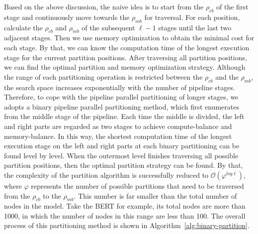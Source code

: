 Based on the above discussion,
the naive idea is to start from the $\rho_{cb}$
of the first stage and continuously move towards the $\rho_{mb}$ for traversal.
For each position, calculate the $\rho_{cb}$ and
$\rho_{mb}$ of the subsequent $\ell - 1$ stages
until the last two adjacent stages.
Then we use memory optimization to obtain the minimal cost for each stage.
By that, we can know the computation time of the longest execution stage for the current partition positions.
After traversing all partition positions,
we can find the optimal partition and memory optimization strategy.
Although the range of each partitioning operation is restricted between the $\rho_{cb}$
and the $\rho_{mb}$, the search space increases exponentially with the number of pipeline stages.
Therefore, to cope with the pipeline parallel partitioning of longer stages,
we adopts a binary pipeline parallel partitioning method,
which first enumerates from the middle stage of the pipeline.
Each time the middle is divided, the left and right parts are regarded as two stages
to achieve compute-balance and memory-balance.
In this way, the shortest computation time of the longest execution stage
on the left and right parts at each binary partitioning can be found level by level.
When the outermost level finishes traversing all possible partition positions,
then the optimal partition strategy can be found.
By that, the complexity of the partition algorithm is successfully
reduced to $\mathcal{O}(\varphi^{log\ell})$,
where $\varphi$ represents the number of possible partitions that
need to be traversed from the $\rho_{cb}$ to the $\rho_{mb}$.
This number is far smaller than the total number of nodes in the model.
Take the BERT for example, its total nodes are more than 1000,
in which the number of nodes in this range are less than 100.
The overall process of this partitioning method is shown in Algorithm~\ref{alg:binary-partition}.

